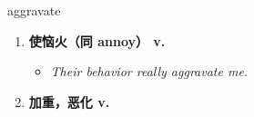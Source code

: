 
\begin{frame}
{\huge aggravate}
\begin{center}
\begin{enumerate}\Large
  \item \textbf{使恼火（同 annoy） v.}
  \begin{itemize}
    \item \em{\Large{Their behavior really aggravate me.}}
  \end{itemize}
  \item \textbf{加重，恶化 v.}
\end{enumerate}
\end{center}
\end{frame}
